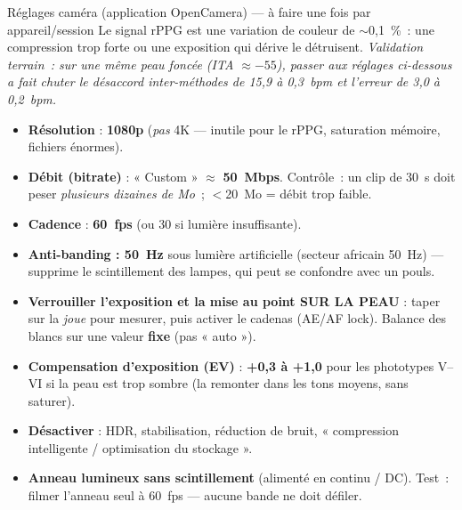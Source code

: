 \documentclass[11pt,a4paper]{article}
\begin{document}
\begin{notebox}{Réglages caméra (application OpenCamera) --- à faire une fois par appareil/session}
Le signal rPPG est une variation de couleur de $\sim$0{,}1~\%~: une compression
trop forte ou une exposition qui dérive le détruisent. \emph{Validation terrain~:
sur une même peau foncée (ITA $\approx -55$), passer aux réglages ci-dessous a fait
chuter le désaccord inter-méthodes de 15{,}9 à 0{,}3~bpm et l'erreur de 3{,}0 à
0{,}2~bpm.}
\begin{itemize}
\item \textbf{Résolution} : \textbf{1080p} (\emph{pas} 4K --- inutile pour le rPPG,
saturation mémoire, fichiers énormes).
\item \textbf{Débit (bitrate)} : « Custom » $\approx$ \textbf{50~Mbps}. Contrôle~:
un clip de 30~s doit peser \emph{plusieurs dizaines de Mo}~; $<$20~Mo = débit trop
faible.
\item \textbf{Cadence} : \textbf{60~fps} (ou 30 si lumière insuffisante).
\item \textbf{Anti-banding : 50~Hz} sous lumière artificielle (secteur africain
50~Hz) --- supprime le scintillement des lampes, qui peut se confondre avec un
pouls.
\item \textbf{Verrouiller l'exposition et la mise au point SUR LA PEAU} : taper sur
la \emph{joue} pour mesurer, puis activer le cadenas (AE/AF lock). Balance des
blancs sur une valeur \textbf{fixe} (pas « auto »).
\item \textbf{Compensation d'exposition (EV)} : \textbf{+0{,}3 à +1{,}0} pour les
phototypes V--VI si la peau est trop sombre (la remonter dans les tons moyens, sans
saturer).
\item \textbf{Désactiver} : HDR, stabilisation, réduction de bruit, « compression
intelligente / optimisation du stockage ».
\item \textbf{Anneau lumineux sans scintillement} (alimenté en continu / DC). Test~:
filmer l'anneau seul à 60~fps --- aucune bande ne doit défiler.
\end{itemize}
\end{notebox}
\end{document}
